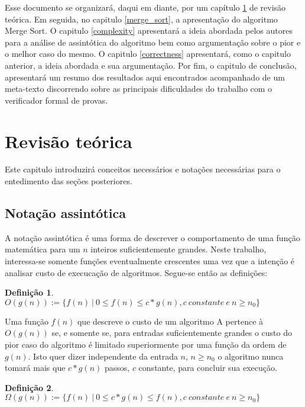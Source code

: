 \documentclass[12pt]{article}
\theoremstyle{definition}
\newtheorem{definition}{Definição}[section]
\begin{document}
Esse documento se organizará, daqui em diante, por um capítulo \ref{explaining} de revisão teórica. Em seguida, no capitulo \ref{merge_sort}, a apresentação do algoritmo Merge Sort. 
O capitulo \ref{complexity} apresentará a ideia abordada pelos autores para a análise de assintótica do algoritmo
bem como argumentação sobre o pior e o melhor caso do mesmo. O capitulo \ref{correctness} apresentará, como o capitulo anterior, a ideia abordada
e sua argumentação. Por fim, o capitulo de conclusão, apresentará um resumo dos resultados aqui encontrados acompanhado de um meta-texto discorrendo sobre
as principais dificuldades do trabalho com o verificador formal de provas.

\section{Revisão teórica}
\label{explaining}

Este capitulo introduzirá conceitos necessários e notações necessárias para o entedimento das seções posteriores.

\subsection{Notação assintótica}

A notação assintótica é uma forma de descrever o comportamento de uma função matemática para um $n$ inteiros suficientemente
grandes. Neste trabalho, interessa-se somente funções eventualmente crescentes uma vez que a intenção é analisar custo de execucação
de algoritmos. Segue-se então as definições:

\theoremstyle{definition}
\begin{definition}
        $O(g(n)) := \{f(n)\ |\ 0 \leq f(n) \leq c * g(n), c\ constante\ e\ n \geq n_0\}$        
\end{definition}

Uma função $f(n)$ que descreve o custo de um algoritmo A pertence à $O(g(n))$ se, e somente se, para entradas 
suficientemente grandes o custo do pior caso do algoritmo é limitado superiormente por uma função da ordem de $g(n)$.
Isto quer dizer independente da entrada $n$, $n \geq n_0$  o algoritmo nunca tomará mais que $c * g(n)$ passos, $c$ constante, para concluir
sua execução.

\theoremstyle{definition}
\begin{definition}
        $\Omega(g(n)) := \{f(n)\ |\ 0 \leq c * g(n) \leq f(n), c\ constante\ e\ n \geq n_0\}$        
\end{definition}
\end{document}
